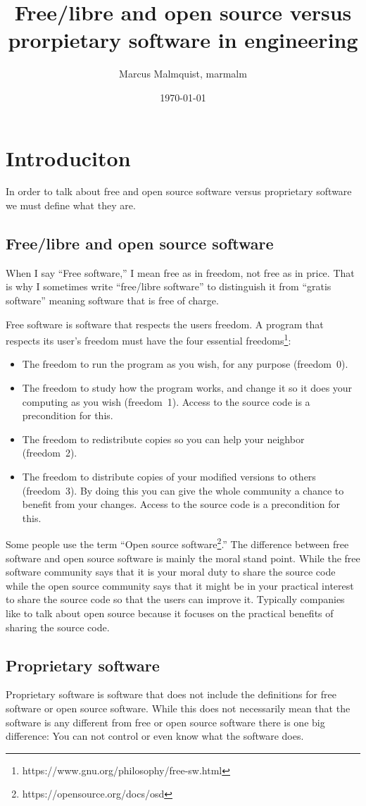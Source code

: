 \documentclass[12pt,a4paper]{article}
\title{Free/libre and open source versus prorpietary software in engineering}
\author{Marcus Malmquist, marmalm}
\date{\today}
\begin{document}
\maketitle

\section{Introduciton}
In order to talk about free and open source software versus proprietary software we must define what they are.
\subsection{Free/libre and open source software}\label{sec:free}
When I say ``Free software,'' I mean free as in freedom, not free as in price. That is why I sometimes write ``free/libre software'' to distinguish it from ``gratis software'' meaning software that is free of charge.

Free software is software that respects the users freedom. A program that respects its user's freedom must have the four essential freedoms\footnote{https://www.gnu.org/philosophy/free-sw.html}:
\begin{itemize}
\item The freedom to run the program as you wish, for any purpose (freedom~0).
\item The freedom to study how the program works, and change it so it does your computing as you wish (freedom~1). Access to the source code is a precondition for this.
\item The freedom to redistribute copies so you can help your neighbor (freedom~2).
\item The freedom to distribute copies of your modified versions to others (freedom~3). By doing this you can give the whole community a chance to benefit from your changes. Access to the source code is a precondition for this.
\end{itemize}
Some people use the term ``Open source software\footnote{https://opensource.org/docs/osd}.'' The difference between free software and open source software is mainly the moral stand point. While the free software community says that it is your moral duty to share the source code while the open source community says that it might be in your practical interest to share the source code so that the users can improve it. Typically companies like to talk about open source because it focuses on the practical benefits of sharing the source code.
\subsection{Proprietary software}
\noindent Proprietary software is software that does not include the definitions for free software or open source software. While this does not necessarily mean that the software is any different from free or open source software there is one big difference: You can not control or even know what the software does.
\end{document}
